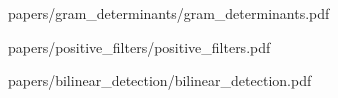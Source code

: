 \documentclass[11pt]{article}
\begin{document}
\clearpage
\hypersetup{pageanchor=false}

 {papers/gram_determinants/gram_determinants.pdf}

 {papers/positive_filters/positive_filters.pdf}

 {papers/bilinear_detection/bilinear_detection.pdf}
\end{document}

